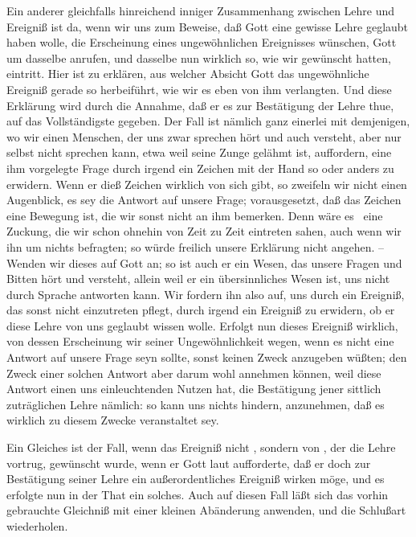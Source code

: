 \begin{aufza}
\begin{aufzb}
\item Ein anderer gleichfalls hinreichend inniger Zusammenhang zwischen Lehre und Ereigniß ist da, wenn wir uns zum Beweise, daß Gott eine gewisse Lehre geglaubt haben wolle, die Erscheinung eines ungewöhnlichen Ereignisses wünschen, Gott um dasselbe anrufen, und dasselbe nun wirklich so, wie wir gewünscht hatten, eintritt. Hier ist zu erklären, aus welcher Absicht Gott das ungewöhnliche Ereigniß gerade so herbeiführt, wie wir es eben von ihm verlangten. Und diese Erklärung wird durch die Annahme, daß er es zur Bestätigung der Lehre thue, auf das Vollständigste gegeben. Der Fall ist nämlich ganz einerlei mit demjenigen, wo wir einen Menschen, der uns zwar sprechen hört und auch versteht, aber nur selbst nicht sprechen kann, etwa weil seine Zunge gelähmt ist, auffordern, eine ihm vorgelegte Frage durch irgend ein Zeichen mit der Hand so oder anders zu erwidern. Wenn er dieß Zeichen wirklich von sich gibt, so zweifeln wir nicht einen Augenblick, es sey die Antwort auf unsere Frage; vorausgesetzt, daß das Zeichen eine Bewegung ist, die wir sonst nicht an ihm bemerken. Denn wäre es \zB\ eine Zuckung, die wir schon ohnehin von Zeit zu Zeit eintreten sahen, auch wenn wir ihn um nichts befragten; so würde freilich unsere Erklärung nicht angehen. -- Wenden wir dieses auf Gott an; so ist auch er ein Wesen, das unsere Fragen und Bitten hört und versteht, allein weil er ein übersinnliches Wesen ist, uns nicht durch Sprache antworten kann. Wir fordern ihn also auf, uns durch ein Ereigniß, das sonst nicht einzutreten pflegt, durch irgend ein  Ereigniß zu erwidern, ob er diese Lehre von uns geglaubt wissen wolle. Erfolgt nun dieses Ereigniß wirklich, von dessen Erscheinung wir seiner Ungewöhnlichkeit wegen, wenn es nicht eine Antwort auf unsere Frage seyn sollte, sonst keinen Zweck anzugeben wüßten; den Zweck einer solchen Antwort aber darum wohl annehmen können, weil diese Antwort einen uns einleuchtenden Nutzen hat, die Bestätigung jener sittlich zuträglichen Lehre nämlich: so kann uns nichts hindern, anzunehmen, daß es wirklich zu diesem Zwecke veranstaltet sey.
\item Ein Gleiches ist der Fall, wenn das Ereigniß nicht , sondern von , der die Lehre vortrug, gewünscht wurde, wenn er Gott laut aufforderte, daß er doch zur Bestätigung seiner Lehre ein außerordentliches Ereigniß wirken möge, und es erfolgte nun in der That ein solches. Auch auf diesen Fall läßt sich das vorhin gebrauchte Gleichniß mit einer kleinen Abänderung anwenden, und die Schlußart wiederholen.

\end{aufzb}
\end{aufza}
